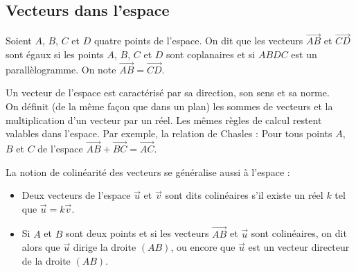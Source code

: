 \documentclass[10pt]{article}
\begin{document}

\subsection{Vecteurs dans l'espace}

Soient $A$, $B$, $C$ et $D$ quatre points de l'espace. On dit que les vecteurs $\Vec{AB}$ et $\Vec{CD}$ sont égaux si
les points $A$, $B$, $C$ et $D$ sont coplanaires et si $ABDC$ est un parallèlogramme. On note $\Vec{AB}=\Vec{CD}$.\newline

Un vecteur de l'espace est caractérisé par sa direction, son sens et sa norme.\\
On définit (de la même façon que dans un plan) les sommes de vecteurs et la multiplication d'un vecteur par un réel. Les
mêmes règles de calcul restent valables dans l'espace. Par exemple, la relation de Chasles : Pour tous points $A$, $B$
et $C$ de l'espace $\Vec{AB}+\Vec{BC}=\Vec{AC}$.\newline

La notion de colinéarité des vecteurs se généralise aussi à l'espace : 
\begin{itemize}
    \item Deux vecteurs de l'espace $\vec{u}$ et $\vec{v}$ sont dits colinéaires s'il existe un réel $k$ tel que
    $\vec{u}=k\vec{v}$.\newline
    \item Si $A$ et $B$ sont deux points et si les vecteurs $\Vec{AB}$ et $\vec{u}$ sont colinéaires, on dit alors que
    $\vec{u}$ dirige la droite $(AB)$, ou encore que $\vec{u}$ est un vecteur directeur de la droite $(AB)$.
\end{itemize}
\end{document}
